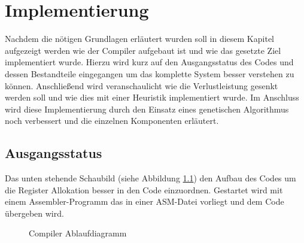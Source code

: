 \chapter{Implementierung}
\label{chap:Implementierung}
Nachdem die nötigen Grundlagen erläutert wurden soll in diesem Kapitel aufgezeigt werden wie der Compiler aufgebaut ist und wie das gesetzte Ziel implementiert wurde. Hierzu wird kurz auf den Ausgangsstatus des Codes und dessen Bestandteile eingegangen um das komplette System besser verstehen zu können. Anschließend wird veranschaulicht wie die Verlustleistung gesenkt werden soll und wie dies mit einer Heuristik implementiert wurde. Im Anschluss wird diese Implementierung durch den Einsatz eines genetischen Algorithmus noch verbessert und die einzelnen Komponenten erläutert.
\section{Ausgangsstatus}
 Das unten stehende Schaubild (siehe Abbildung \ref{fig:flow_compiler}) den Aufbau des Codes um die Register Allokation besser in den Code einzuordnen. Gestartet wird mit einem Assembler-Programm das in einer ASM-Datei vorliegt und dem Code übergeben wird.


\begin{scriptsize}
	\begin{figure}[htbp] 
		\centering
		
		\caption{Compiler Ablaufdiagramm}
		\label{fig:flow_compiler}
	\end{figure}
\end{scriptsize}

